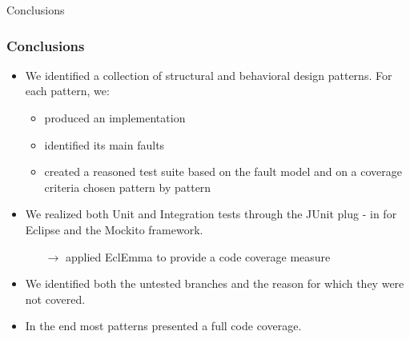 \documentclass{beamer}
\theoremstyle{definition}
\begin{document}
		
		\begin{section}{}
			\begin{subsection}{Conclusions}
				\begin{frame}
					
					\frametitle{Conclusions}
						\begin{itemize}
						\item We identified a collection of structural and behavioral design patterns. For each pattern, we:
							{\footnotesize \begin{itemize}
								\item produced an implementation
							\end{itemize} 
							\begin{itemize}
								\item identified its main faults
							\end{itemize} 
								\begin{itemize}
									\vspace{-0.8mm}
									\item created a reasoned test suite based on the fault model and on a coverage criteria chosen pattern by pattern
								\end{itemize} }
						
						\item We realized both Unit and Integration tests through the JUnit plug - in for Eclipse and the Mockito framework.
								{\footnotesize \begin{itemize}
									\item[$ \rightarrow $] applied EclEmma to provide a code coverage measure
								\end{itemize}} 
								
						\item We identified both the untested branches and the reason for which they were not covered.
						
						\item In the end most patterns presented a full code coverage.
					\end{itemize}
					
				\end{frame}
			\end{subsection}
		\end{section}
\end{document}
